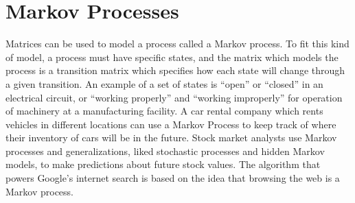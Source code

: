\section{Markov Processes}

Matrices can be used to model a process called a Markov process. To fit this kind of model, a process must have specific states, and the matrix which models the process is a transition matrix which specifies how each state will change through a given transition. An example of a set of states is ``open'' or ``closed'' in an electrical circuit, or ``working properly'' and ``working improperly'' for operation of machinery at a manufacturing facility. A car rental company which rents vehicles in different locations can use a Markov Process to keep track of where their inventory of cars will be in the future. Stock market analysts use Markov processes and generalizations, liked stochastic processes and hidden Markov models, to make predictions about future stock values.  The algorithm that powers Google's internet search is based on the idea that browsing the web is a Markov process.

